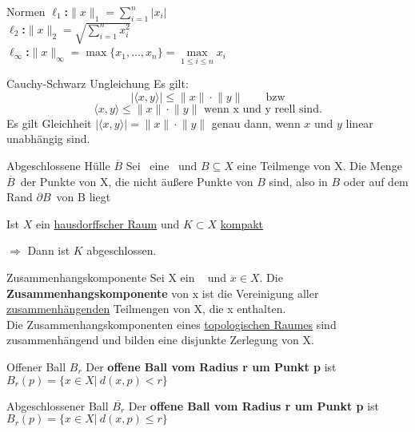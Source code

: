 \begin{titleDef}{Normen}
\textbf{$\ell_1$:}$\displaystyle\lVert x\rVert_1=\sum_{i=1}^{n}\lvert x_i\rvert$      \\  
\textbf{$\ell_2$:}$\displaystyle\lVert x\rVert_2=\sqrt{\sum_{i=1}^{n}x_i^2}$   \\
\textbf{$\ell_\infty$:}$\displaystyle\lVert x\rVert_\infty=\max\{x_1,\ldots,x_n\}=\max\limits_{1\leq i\leq n}x_i$      
\end{titleDef}

\begin{titleDef}{Cauchy-Schwarz Ungleichung}
\label{cauchyschwarz}
Es gilt:
$$\lvert\langle x,y\rangle\rvert\leq\lVert x\rVert\cdot\lVert y\rVert\qquad\text{bzw}$$
$$\langle x,y\rangle\leq\lVert x\rVert\cdot\lVert y\rVert\text{    wenn x und y reell sind.}$$
Es gilt Gleichheit $\lvert\langle x,y\rangle\rvert=\lVert x\rVert\cdot\lVert y\rVert$ genau dann, wenn $x$ und $y$ linear unabhängig sind.
\end{titleDef}

\begin{titleDef}{Abgeschlossene Hülle $\overline{B}$}
\label{abhuelle}
Sei \Topo~eine \Toporef~und $B\subseteq X$ eine Teilmenge von X. Die Menge $\overline{B}$~der Punkte von X, die nicht äußere Punkte von $B$ sind, also in $B$ oder auf dem Rand $\partial B$~von B liegt\par
Ist $X$ ein \hyperref[hausdorffsch]{hausdorffscher Raum} und $K\subset X$ \hyperref[kompakt]{kompakt}\par $\Rightarrow$ Dann ist $K$ abgeschlossen.
\end{titleDef}

\begin{titleDef}{Zusammenhangskomponente}
\label{zsmkomponente}
Sei X ein \Toporef~ und $x\in X$. Die \textbf{Zusammenhangskomponente} von x ist die Vereinigung aller \hyperref[zusammenhang]{zusammenhängenden} Teilmengen von X, die x enthalten.\\
Die Zusammenhangskomponenten eines \hyperref[Topologie]{topologischen Raumes} sind zusammenhängend und bilden eine disjunkte Zerlegung von X.
\end{titleDef}

\begin{titleDef}{Offener Ball $B_r$}
\label{balloffen}
Der \textbf{offene Ball vom Radius r um Punkt p} ist \\$B_r(p)=\{x\in X|\ d(x,p)<r\}$
\end{titleDef}

\begin{titleDef}{Abgeschlossener Ball $\overline{B_r}$}
\label{ballabgeschlossen}
Der \textbf{offene Ball vom Radius r um Punkt p} ist \\$B_r(p)=\{x\in X|\ d(x,p)\le r\}$
\end{titleDef}

